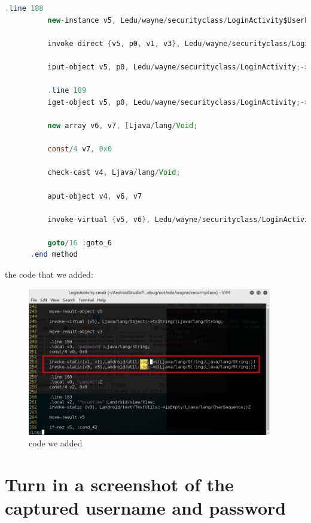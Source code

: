 \documentclass[onecolumn,oneside]{SUSTechHomework}
\begin{document}
\begin{lstlisting}[language={java}]
          .line 188
          new-instance v5, Ledu/wayne/securityclass/LoginActivity$UserLoginTask;
      
          invoke-direct {v5, p0, v1, v3}, Ledu/wayne/securityclass/LoginActivity$UserLoginTask;-><init>(Ledu/wayne/securityclass/LoginActivity;Ljava/lang/String;Ljava/lang/String;)V
      
          iput-object v5, p0, Ledu/wayne/securityclass/LoginActivity;->mAuthTask:Ledu/wayne/securityclass/LoginActivity$UserLoginTask;
      
          .line 189
          iget-object v5, p0, Ledu/wayne/securityclass/LoginActivity;->mAuthTask:Ledu/wayne/securityclass/LoginActivity$UserLoginTask;
      
          new-array v6, v7, [Ljava/lang/Void;
      
          const/4 v7, 0x0
      
          check-cast v4, Ljava/lang/Void;
      
          aput-object v4, v6, v7
      
          invoke-virtual {v5, v6}, Ledu/wayne/securityclass/LoginActivity$UserLoginTask;->execute([Ljava/lang/Object;)Landroid/os/AsyncTask;
      
          goto/16 :goto_6
      .end method
    \end{lstlisting}

    the code that we added:

    \begin{figure}[H]
      \centering
      \includegraphics[width=0.95\textwidth]{img/pic2.png}
      \caption{code we added}
    \end{figure}

  \section{Turn in a screenshot of the captured username and password}
\end{document}
